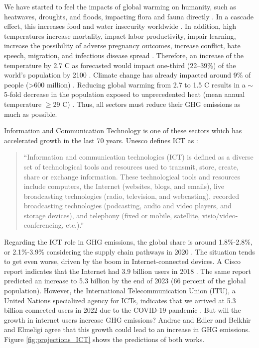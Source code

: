 We have started to feel the impacts of global warming on humanity, such as heatwaves, droughts, and floods, impacting flora and fauna directly \cite{masson2018global, change2022threat}. In a cascade effect, this increases food and water insecurity worldwide \cite{change2022threat, doi:10.1126/science.1239402}. In addition, high temperatures increase mortality, impact labor productivity, impair learning, increase the possibility of adverse pregnancy outcomes, increase conflict, hate speech, migration, and infectious disease spread \cite{lenton2023quantifying}. Therefore, an increase of the temperature by 2.7 \degree C as forecasted would impact one-third (22–39\%) of the world's population by 2100 \cite{lenton2023quantifying}. Climate change has already impacted around 9\% of people (>600 million) \cite{lenton2023quantifying}. Reducing global warming from 2.7 to 1.5 \degree C results in a $\sim$5-fold decrease in the population exposed to unprecedented heat (mean annual temperature $\geq$29 \degree C) \cite{lenton2023quantifying}. Thus, all sectors must reduce their GHG emissions as much as possible.

Information and Communication Technology is one of these sectors which has accelerated growth in the last 70 years. Unesco defines ICT as \cite{unesco2009guide}:

\begin{quote}
    ``Information and communication technologies (ICT) is defined as a diverse set of technological tools and resources used to transmit, store, create, share or exchange information. These technological tools and resources include computers, the Internet (websites, blogs, and emails), live broadcasting technologies (radio, television, and webcasting), recorded broadcasting technologies (podcasting, audio and video players, and storage devices), and telephony (fixed or mobile, satellite, visio/video-conferencing, etc.).''
\end{quote}

Regarding the ICT role in GHG emissions, the global share is around 1.8\%-2.8\%, or 2.1\%-3.9\% considering the supply chain pathways in 2020 \cite{freitag2021climate}. The situation tends to get even worse, driven by the boom in Internet-connected devices. A Cisco report indicates that the Internet had 3.9 billion users in 2018 \cite{cisco2020cisco}. The same report predicted an increase to 5.3 billion by the end of 2023 (66 percent of the global population). However, the International Telecommunication Union (ITU), a United Nations specialized agency for ICTs, indicates that we arrived at 5.3 billion connected users in 2022 due to the COVID-19 pandemic \cite{ITU2022}. But will the growth in internet users increase GHG emissions? Andrae and Edler \cite{andrae2015global} and Belkhir and Elmeligi \cite{belkhir2018assessing} agree that this growth could lead to an increase in GHG emissions. Figure \ref{fig:projections_ICT} shows the predictions of both works.


